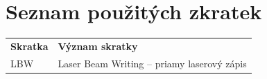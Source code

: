 \documentclass[twoside]{ctuthesis}
\theoremstyle{plain}
\theoremstyle{definition}
\theoremstyle{note}
\begin{document}
%
%
\appendix
\chapter*{Seznam použitých zkratek}
\noindent


\begin{tabularx}{\linewidth}
{ l >{\raggedright\arraybackslash}X }
\bfseries Skratka & \bfseries Význam skratky \\\Midrule
LBW &  Laser Beam Writing -- priamy laserový zápis\\
\end{tabularx}

\appendix




\end{document}
